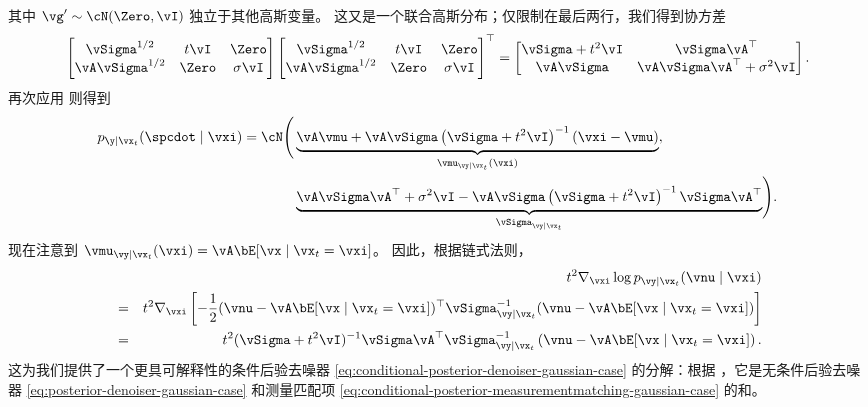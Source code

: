\documentclass[../../book-main_zh.tex]{subfiles}
\begin{document}
\begin{example}
\begin{equation}
    \end{equation}
    其中 $\vg' \sim \cN(\Zero, \vI)$ 独立于其他高斯变量。
    这又是一个联合高斯分布；仅限制在最后两行，我们得到协方差
    \begin{equation*}
        \begin{bmatrix}
            \vSigma^{1/2} & t\vI & \Zero \\
            \vA \vSigma^{1/2} & \Zero & \sigma \vI
        \end{bmatrix}
        \begin{bmatrix}
            \vSigma^{1/2} & t\vI & \Zero \\
            \vA \vSigma^{1/2} & \Zero & \sigma \vI
        \end{bmatrix}^\top
        =
        \begin{bmatrix}
            \vSigma + t^2\vI & \vSigma\vA^\top \\
            \vA\vSigma & \vA\vSigma\vA^\top + \sigma^2 \vI
        \end{bmatrix}.
    \end{equation*}
    再次应用  则得到
    \begin{equation}
        \begin{split}
            p_{\y \mid \vx_t}(\spcdot \mid \vxi) = \cN\Biggl(
                &\underbrace{%
                    \vA\vmu + \vA\vSigma\left( \vSigma + t^2 \vI \right)^{-1}
                    \left(
                        \vxi - \vmu
                    \right)
                }_{\vmu_{\vy \mid \vx_t}(\vxi)}, \\
                &\underbrace{%
                    \vA\vSigma\vA^\top + \sigma^2 \vI - \vA\vSigma
                    \left( \vSigma
                    + t^2 \vI\right)^{-1} \vSigma \vA^\top
                }_{\vSigma_{\vy\mid \vx_t}}
            \Biggr).
        \end{split}
    \end{equation}
    现在注意到 $\vmu_{\vy \mid \vx_t}(\vxi) = \vA \bE[\vx \mid
    \vx_t=\vxi]$。
    因此，根据链式法则，
    \begin{eqnarray}
        &&t^2 \nabla_{\vxi} \log p_{\vy \mid \vx_t}(\vnu \mid \vxi)\nonumber \\
        &=&
        t^2 \nabla_{\vxi}\left[
            -\frac{1}{2}
            (\vnu - \vA \bE[\vx \mid \vx_t=\vxi])^\top
            \vSigma_{\vy \mid \vx_t}^{-1}
            (\vnu - \vA \bE[\vx \mid \vx_t=\vxi])
        \right]\nonumber
        \\
        &=& t^2 (\vSigma+t^2 \vI)^{-1}\vSigma\vA^\top\vSigma_{\vy \mid
        \vx_t}^{-1}\left(
        \vnu - \vA \bE[\vx \mid \vx_t=\vxi] \right).
        \label{eq:conditional-posterior-measurementmatching-gaussian-case}
    \end{eqnarray}
    这为我们提供了一个更具可解释性的条件后验去噪器 \eqref{eq:conditional-posterior-denoiser-gaussian-case} 的分解：根据
    ，它是无条件后验去噪器 \eqref{eq:posterior-denoiser-gaussian-case}
    和测量匹配项
    \eqref{eq:conditional-posterior-measurementmatching-gaussian-case} 的和。


\end{example}
\end{document}
